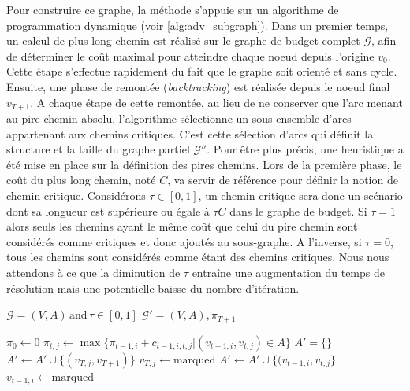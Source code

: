 \documentclass[12pt, a4paper, twoside]{report}
\numberwithin{equation}{section}
\begin{document}
\begin{Figure}[H]
	Pour construire ce graphe, la méthode s'appuie sur un algorithme de programmation dynamique (voir \ref{alg:adv_subgraph}). Dans un premier temps, un calcul de plus long chemin est réalisé sur le graphe de budget complet $\mathcal{G}$, afin de déterminer le coût maximal pour atteindre chaque noeud depuis l'origine $v_0$. Cette étape s'effectue rapidement du fait que le graphe soit orienté et sans cycle. Ensuite, une phase de remontée (\textit{backtracking}) est réalisée depuis le noeud final $v_{T+1}$. A chaque étape de cette remontée, au lieu de ne conserver que l'arc menant au pire chemin absolu, l'algorithme sélectionne un sous-ensemble d'arcs appartenant aux chemins critiques. C'est cette sélection d'arcs qui définit la structure et la taille du graphe partiel $\mathcal{G}''$. Pour être plus précis, une heuristique a été mise en place sur la définition des pires chemins. Lors de la première phase, le coût du plus long chemin, noté $C$, va servir de référence pour définir la notion de chemin critique. Considérons $\tau\in[0, 1]$, un chemin critique sera donc un scénario dont sa longueur est supérieure ou égale à $\tau C$ dans le graphe de budget. Si $\tau=1$ alors seuls les chemins ayant le même coût que celui du pire chemin sont considérés comme critiques et donc ajoutés au sous-graphe. A l'inverse, si $\tau=0$, tous les chemins sont considérés comme étant des chemins critiques. Nous nous attendons à ce que la diminution de $\tau$ entraîne une augmentation du temps de résolution mais une potentielle baisse du nombre d'itération.
	
	\begin{algorithm}[H]
		\caption{Adv\_subGraph}
		\label{alg:adv_subgraph}
		\begin{algorithmic}[1]
			\Require $\mathcal{G}=(V, A)\, \text{and}\, \tau\in[0, 1]$
			\Ensure $\mathcal{G}'=(V, A), \pi_{T+1}$
			
			\State $\pi_0 \gets 0$
			\State $\pi_{t, j} \gets \max\{\pi_{t-1, i}+c_{t-1, i, t, j} | (v_{t-1, i}, v_{t, j})\in A\}$
			\EndFor
			\EndFor
			\State $A'=\{\}$
			\State $A'\gets A'\cup \{(v_{T, j}, v_{T+1})\}$
			\State $v_{T, j}\gets\text{marqued}$
			\EndIf
			\State $A'\gets A'\cup \{(v_{t-1, i}, v_{t, j}\}$
			\State $v_{t-1, i}\gets \text{marqued}$
			\EndIf
			\EndFor
			\EndIf
			\EndFor
			\EndFor
			

\end{algorithmic}
\end{algorithm}
\end{Figure}
\end{document}
